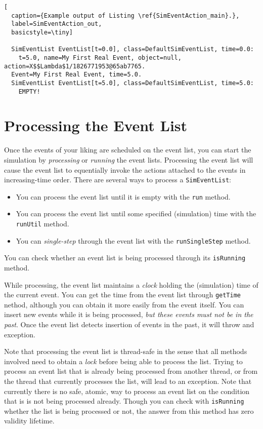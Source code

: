 \begin{lstfloat}
\begin{lstlisting}[
  caption={Example output of Listing \ref{SimEventAction_main}.},
  label=SimEventAction_out,
  basicstyle=\tiny]

  SimEventList EventList[t=0.0], class=DefaultSimEventList, time=0.0:
    t=5.0, name=My First Real Event, object=null, action=X$$Lambda$1/1826771953@65ab7765.
  Event=My First Real Event, time=5.0.
  SimEventList EventList[t=5.0], class=DefaultSimEventList, time=5.0:
    EMPTY!

\end{lstlisting}
\end{lstfloat}

\section{Processing the Event List}

Once the events of your liking are scheduled on the event list,
  you can start the simulation by {\em processing\/} or {\em running\/}
  the event lists.
Processing the event list will cause the event list to
  equentially invoke the actions attached to the events
  in increasing-time order.
There are several ways to process a \lstinline{SimEventList}:
\begin{itemize}
  \item You can process the event list until it is empty with the \lstinline{run} method.
  \item You can process the event list until some specified (simulation) time with the
          \lstinline{runUtil} method.
  \item You can {\em single-step\/} through the event list with the
          \lstinline{runSingleStep} method.
\end{itemize}
You can check whether an event list is being processed through its \lstinline{isRunning}
  method.

While processing, the event list maintains a {\em clock}
  holding the (simulation) time of the current event.
You can get the time from the event list through \lstinline{getTime} nethod,
  although you can obtain it more easily from the event itself.
You can insert new events while it is being processed,
  {\em but these events must not be in the past}.
Once the event list detects insertion of events in the past,
  it will throw and exception.

Note that processing the event list
  is thread-safe in the sense that all methods involved
  need to obtain a {\em lock} before being able to process the list.
Trying to process an event list that is already being processed
  from another thread,
  or from the thread that currently processes the list,
  will lead to an exception.
Note that currently there is no safe, atomic, way
  to process an event list on the condition that is
  is not being processed already.
Though you can check with \lstinline{isRunning}
  whether the list is being processed or not,
  the answer from this method has zero validity lifetime.

